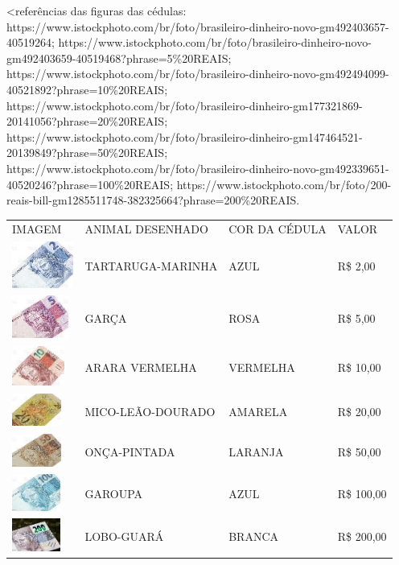 \textless{}referências das figuras das cédulas:
https://www.istockphoto.com/br/foto/brasileiro-dinheiro-novo-gm492403657-40519264;
https://www.istockphoto.com/br/foto/brasileiro-dinheiro-novo-gm492403659-40519468?phrase=5\%20REAIS;
https://www.istockphoto.com/br/foto/brasileiro-dinheiro-novo-gm492494099-40521892?phrase=10\%20REAIS;
https://www.istockphoto.com/br/foto/brasileiro-dinheiro-gm177321869-20141056?phrase=20\%20REAIS;
https://www.istockphoto.com/br/foto/brasileiro-dinheiro-gm147464521-20139849?phrase=50\%20REAIS;
https://www.istockphoto.com/br/foto/brasileiro-dinheiro-novo-gm492339651-40520246?phrase=100\%20REAIS;
https://www.istockphoto.com/br/foto/200-reais-bill-gm1285511748-382325664?phrase=200\%20REAIS.

\begin{longtable}[]{@{}llll@{}}
\toprule
IMAGEM & ANIMAL DESENHADO & COR DA CÉDULA & VALOR\tabularnewline
\includegraphics[width=0.79592in,height=0.59694in]{media/image47.jpg} &
TARTARUGA-MARINHA & AZUL & R\$ 2,00\tabularnewline
\includegraphics[width=0.73274in,height=0.54956in]{media/image48.jpg} &
GARÇA & ROSA & R\$ 5,00\tabularnewline
\includegraphics[width=0.68163in,height=0.51122in]{media/image49.jpg} &
ARARA VERMELHA & VERMELHA & R\$ 10,00\tabularnewline
\includegraphics[width=0.63139in,height=0.41990in]{media/image50.jpg} &
MICO-LEÃO-DOURADO & AMARELA & R\$ 20,00\tabularnewline
\includegraphics[width=0.63326in,height=0.42114in]{media/image51.jpg} &
ONÇA-PINTADA & LARANJA & R\$ 50,00\tabularnewline
\includegraphics[width=0.62794in,height=0.47095in]{media/image52.jpg} &
GAROUPA & AZUL & R\$ 100,00\tabularnewline
\includegraphics[width=0.63126in,height=0.42104in]{media/image53.jpg} &
LOBO-GUARÁ & BRANCA & R\$ 200,00\tabularnewline
\bottomrule
\end{longtable}

